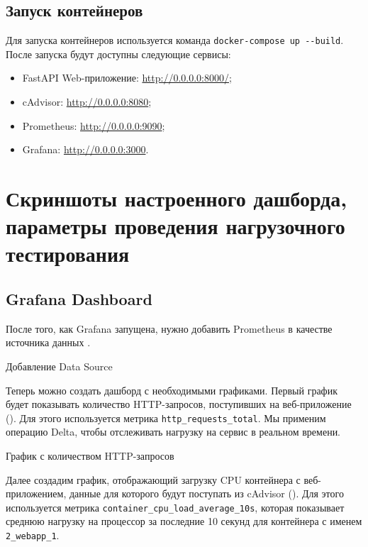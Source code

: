 \subsection{Запуск контейнеров}

Для запуска контейнеров используется команда \verb|docker-compose up --build|.
После запуска будут доступны следующие сервисы:

\begin{itemize}
    \item FastAPI Web-приложение: \url{http://0.0.0.0:8000/};
    \item cAdvisor: \url{http://0.0.0.0:8080};
    \item Prometheus: \url{http://0.0.0.0:9090};
    \item Grafana: \url{http://0.0.0.0:3000}.
\end{itemize}

\clearpage
\section{Скриншоты настроенного дашборда,
    параметры проведения нагрузочного тестирования}

\subsection{Grafana Dashboard}

После того, как Grafana запущена, нужно добавить Prometheus
в качестве источника данных .

\begin{image}
    \caption{Добавление Data Source}
    \label{fig:data-source:add}
\end{image}

Теперь можно создать дашборд с необходимыми графиками.
Первый график будет показывать количество HTTP-запросов, поступивших на веб-приложение ().
Для этого используется метрика \verb|http_requests_total|.
Мы применим операцию Delta, чтобы отслеживать нагрузку на сервис в реальном времени.

\begin{image}
    \caption{График с количеством HTTP-запросов}
    \label{fig:graph:requests}
\end{image}

Далее создадим график, отображающий загрузку CPU контейнера с веб-приложением, данные для которого будут поступать из
cAdvisor ().
Для этого используется метрика \verb|container_cpu_load_average_10s|,
которая показывает среднюю нагрузку на процессор за последние 10 секунд для контейнера с именем \verb|2_webapp_1|.

